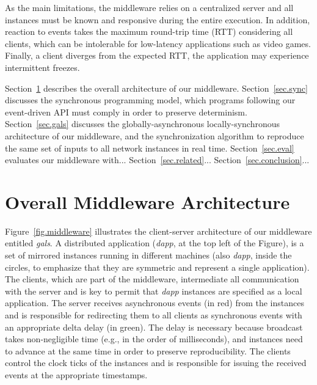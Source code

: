 \documentclass[sigplan,screen]{acmart}
\begin{document}
As the main limitations, the middleware relies on a centralized server and all
instances must be known and responsive during the entire execution.
In addition, reaction to events takes the maximum round-trip time (RTT)
considering all clients, which can be intolerable for low-latency applications
such as video games.
Finally, a client diverges from the expected RTT, the application may
experience intermittent freezes.

Section~\ref{sec.arch} describes the overall architecture of our middleware.
Section~\ref{sec.sync} discusses the synchronous programming model, which
programs following our event-driven API must comply in order to preserve
determinism.
Section~\ref{sec.gals} discusses the globally-asynchronous locally-synchronous
architecture of our middleware, and the synchronization algorithm to reproduce
the same set of inputs to all network instances in real time.
Section~\ref{sec.eval} evaluates our middleware with...
Section~\ref{sec.related}...
Section~\ref{sec.conclusion}...

\section{Overall Middleware Architecture}
\label{sec.arch}

Figure~\ref{fig.middleware} illustrates the client-server architecture of our
middleware entitled \emph{gals}.
A distributed application (\emph{dapp}, at the top left of the Figure), is a
set of mirrored instances running in different machines (also \emph{dapp},
inside the circles, to emphasize that they are symmetric and represent a single
application).
The clients, which are part of the middleware, intermediate all communication
with the server and is key to permit that \emph{dapp} instances are specified
as a local application.
The server receives asynchronous events (in red) from the instances and is
responsible for redirecting them to all clients as synchronous events with an
appropriate delta delay (in green).
The delay is necessary because broadcast takes non-negligible time (e.g., in
the order of milliseconds), and instances need to advance at the same time in
order to preserve reproducibility.
The clients control the clock ticks of the instances and is responsible for
issuing the received events at the appropriate timestamps.
\end{document}
